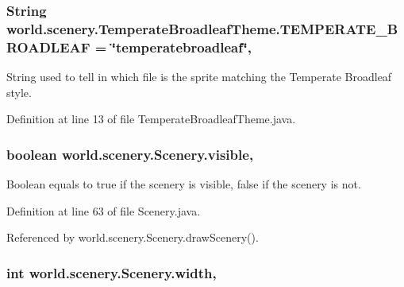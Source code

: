 \hypertarget{a00030_a9e9253b684231327dd6ddeca5768033e}{
\subsubsection[{T\-E\-M\-P\-E\-R\-A\-T\-E\-\_\-\-B\-R\-O\-A\-D\-L\-E\-A\-F}]{\setlength{\rightskip}{0pt plus 5cm}String world.\-scenery.\-Temperate\-Broadleaf\-Theme.\-T\-E\-M\-P\-E\-R\-A\-T\-E\-\_\-\-B\-R\-O\-A\-D\-L\-E\-A\-F = \char`\"{}temperatebroadleaf\char`\"{}\hspace{0.3cm}{\ttfamily [static]}, {\ttfamily [inherited]}}}\label{a00030_a9e9253b684231327dd6ddeca5768033e}


String used to tell in which file is the sprite matching the Temperate Broadleaf style. 



Definition at line 13 of file Temperate\-Broadleaf\-Theme.\-java.

\hypertarget{a00024_a7b22a78d3126c947b7010fdbbea02218}{
\subsubsection[{visible}]{\setlength{\rightskip}{0pt plus 5cm}boolean world.\-scenery.\-Scenery.\-visible\hspace{0.3cm}{\ttfamily [protected]}, {\ttfamily [inherited]}}}\label{a00024_a7b22a78d3126c947b7010fdbbea02218}


Boolean equals to true if the scenery is visible, false if the scenery is not. 



Definition at line 63 of file Scenery.\-java.



Referenced by world.\-scenery.\-Scenery.\-draw\-Scenery().

\hypertarget{a00024_ad10b27080954e2fc06aa1718f47c4ce1}{
\subsubsection[{width}]{\setlength{\rightskip}{0pt plus 5cm}int world.\-scenery.\-Scenery.\-width\hspace{0.3cm}{\ttfamily [protected]}, {\ttfamily [inherited]}}}\label{a00024_ad10b27080954e2fc06aa1718f47c4ce1}



